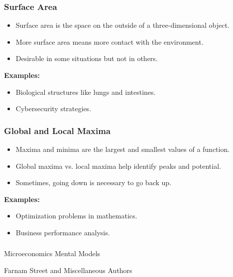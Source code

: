 \begin{frame}[fragile]\frametitle{Surface Area}
\begin{itemize}
    \item Surface area is the space on the outside of a three-dimensional object.
    \item More surface area means more contact with the environment.
    \item Desirable in some situations but not in others.
\end{itemize}
\textbf{Examples:}
\begin{itemize}
    \item Biological structures like lungs and intestines.
    \item Cybersecurity strategies.
\end{itemize}
\end{frame}

\begin{frame}[fragile]\frametitle{Global and Local Maxima}
\begin{itemize}
    \item Maxima and minima are the largest and smallest values of a function.
    \item Global maxima vs. local maxima help identify peaks and potential.
    \item Sometimes, going down is necessary to go back up.
\end{itemize}
\textbf{Examples:}
\begin{itemize}
    \item Optimization problems in mathematics.
    \item Business performance analysis.
\end{itemize}
\end{frame}


\begin{frame}[fragile]\frametitle{}
\begin{center}
{\Large Microeconomics Mental Models}

{\tiny Farnam Street and Miscellaneous Authors }


\end{center}
\end{frame}

